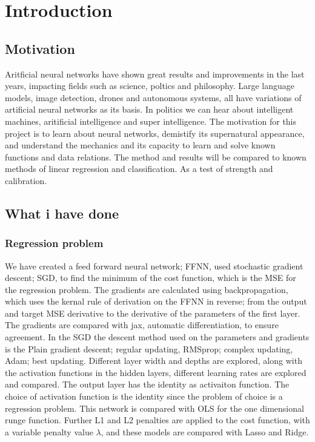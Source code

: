 \section{Introduction}
\label{sec:introduction}

\subsection{Motivation} 
Aritficial neural networks have shown great results
and improvements in the last years, impacting fields such 
as science, poltics and philosophy. Large language models, image detection,
drones and autonomous systems, all have variations of 
artificial neural networks as its basis. In politics we can hear
about intelligent machines, aritificial intelligence and super intelligence.
The motivation for this project is to learn about neural networks, demistify
its supernatural appearance, and understand the mechanics
and its capacity to learn and solve known functions and data relations.  
The method and results will be compared to known methods of linear
regression and classification. As a test of strength and calibration.


\subsection{What i have done}
\subsubsection{Regression problem}
We have created a feed forward neural network; FFNN, used stochastic gradient descent; SGD,
to find the minimum of the cost function, which is the MSE for the regression problem. 
The gradients are calculated using backpropagation, which uses the kernal rule of derivation
on the FFNN in reverse; from the output and target MSE derivative to the
derivative of the parameters of the first layer. 
The gradients are compared with jax, automatic differentiation,
to ensure agreement. In the SGD the descent method used on the parameters and gradients
is the Plain gradient descent; regular updating, 
RMSprop; complex updating, Adam; best updating.  
Different layer width and depths are explored, along with the activation functions
in the hidden layers, different learning rates are explored and compared. 
The output layer has the identity as activaiton function.
The choice of activation function is the identity since the problem of choice is a 
regression problem. This network is compared with OLS for the one dimensional runge function.
Further L1 and L2 penalties are applied to the cost function, with a variable
penalty value $\lambda$, and these models are compared with Lasso and Ridge.  
